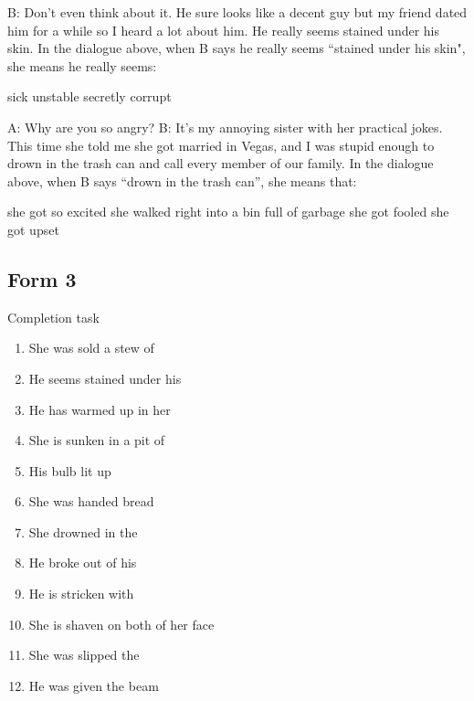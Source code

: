 \documentclass[output=paper]{langsci/langscibook}
\begin{document}
\begin{paperappendix}
{\begin{exe}
\begin{xlist}
        \sn B: Don't even think about it. He sure looks like a decent guy but my friend dated him for a while so I heard a lot about him. He really seems stained under his skin.
        \sn In the dialogue above, when B says he really seems “stained under his skin", she means he really seems:
        \begin{xlist}
         sick
         unstable
         secretly corrupt
        \end{xlist}
        \end{xlist}
    \newpage
     \begin{xlist}
        \sn A: Why are you so angry?
        \sn B: It's my annoying sister with her practical jokes. This time she told me she got married in Vegas, and I was stupid enough to drown in the trash can and call every member of our family.
        \sn In the dialogue above, when B says \enquote{drown in the trash can}, she means that:
        \begin{xlist}
         she got so excited she walked right into a bin full of garbage
         she got  fooled
         she got upset
        \end{xlist}
        \end{xlist}
\end{exe}

\subsection{Form 3}

Completion task
\begin{exe}
    \sn
    \begin{enumerate}
        \item She was sold a stew of \underline{\hphantom{3em}}
        \item He seems stained under his  \underline{\hphantom{3em}}
        \item He has warmed up in her  \underline{\hphantom{3em}}
        \item She is sunken in a pit of  \underline{\hphantom{3em}}
        \item His \underline{\hphantom{3em}} bulb lit up
        \item She was handed   \underline{\hphantom{3em}}  bread
        \item She drowned in the  \underline{\hphantom{3em}}   \underline{\hphantom{3em}}
        \item He  broke out of his  \underline{\hphantom{3em}}
        \item He is stricken with  \underline{\hphantom{3em}}
        \item She is shaven on both  \underline{\hphantom{3em}}  of her face
        \item She was slipped the \underline{\hphantom{3em}}
        \item He was given the \underline{\hphantom{3em}} beam
    \end{enumerate}
\end{exe}

}
\end{paperappendix}
\end{document}
